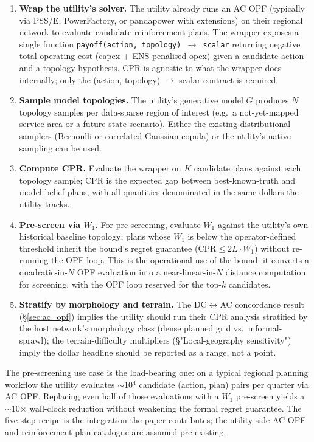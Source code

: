 \documentclass[10pt,a4paper]{article}
\begin{document}
\begin{enumerate}[leftmargin=*,topsep=0pt,itemsep=2pt]
\item \textbf{Wrap the utility's solver.} The utility already runs an
AC OPF (typically via PSS/E, PowerFactory, or pandapower with
extensions) on their regional network to evaluate candidate
reinforcement plans. The wrapper exposes a single function
\texttt{payoff(action, topology) $\to$ scalar} returning negative
total operating cost (capex + ENS-penalised opex) given a
candidate action and a topology hypothesis. CPR is agnostic to
what the wrapper does internally; only the (action, topology) $\to$
scalar contract is required.
\item \textbf{Sample model topologies.} The utility's
generative model $G$ produces $N$ topology samples per
data-sparse region of interest (e.g.\ a not-yet-mapped service
area or a future-state scenario). Either the existing
distributional samplers (Bernoulli or correlated Gaussian copula)
or the utility's native sampling can be used.
\item \textbf{Compute CPR.} Evaluate the wrapper on $K$ candidate
plans against each topology sample; CPR is the expected gap
between best-known-truth and model-belief plans, with all
quantities denominated in the same dollars the utility tracks.
\item \textbf{Pre-screen via $W_1$.} For pre-screening, evaluate
$W_1$ against the utility's own historical baseline topology;
plans whose $W_1$ is below the operator-defined threshold inherit
the bound's regret guarantee
($\mathrm{CPR} \le 2 L \cdot W_1$) without re-running the OPF
loop. This is the operational use of the bound: it converts a
quadratic-in-$N$ OPF evaluation into a near-linear-in-$N$
distance computation for screening, with the OPF loop reserved
for the top-$k$ candidates.
\item \textbf{Stratify by morphology and terrain.} The
DC$\leftrightarrow$AC concordance result (§\ref{sec:ac_opf})
implies the utility should run their CPR analysis stratified by
the host network's morphology class (dense planned grid vs.\
informal-sprawl); the terrain-difficulty multipliers
(§"Local-geography sensitivity") imply the dollar headline
should be reported as a range, not a point.
\end{enumerate}

\noindent The pre-screening use case is the load-bearing one: on a
typical regional planning workflow the utility evaluates $\sim$10$^4$
candidate (action, plan) pairs per quarter via AC OPF. Replacing
even half of those evaluations with a $W_1$ pre-screen yields a
$\sim$10$\times$ wall-clock reduction without weakening the formal
regret guarantee. The five-step recipe is the integration the paper
contributes; the utility-side AC OPF and reinforcement-plan
catalogue are assumed pre-existing.
\end{document}
